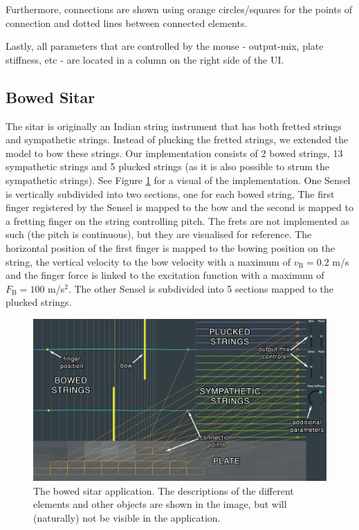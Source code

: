 \documentclass{article}
\begin{document}
Furthermore, connections are shown using orange circles/squares for the points of connection and dotted lines between connected elements.

Lastly, all parameters that are controlled by the mouse - output-mix, plate stiffness, etc - are located in a column on the right side of the UI.

\subsection{Bowed Sitar}
The sitar is originally an Indian string instrument that has both fretted strings and sympathetic strings. Instead of plucking the fretted strings, we extended the model to bow these strings. Our implementation consists of 2 bowed strings, 13 sympathetic strings and 5 plucked strings (as it is also possible to strum the sympathetic strings). See Figure \ref{fig:bowedSitar} for a visual of the implementation. One Sensel is vertically subdivided into two sections, one for each bowed string, The first finger registered by the Sensel is mapped to the bow and the second is mapped to a fretting finger on the string controlling pitch. The frets are not implemented as such (the pitch is continuous), but they are visualised for reference. The horizontal position of the first finger is mapped to the bowing position on the string, the vertical velocity  to the bow velocity with a maximum of $v_\text{B} = 0.2$ m/s and the finger force is linked to the excitation function with a maximum of $F_\text{B} = 100$ m/s$^2$. The other Sensel is subdivided into 5 sections mapped to the plucked strings. 

\begin{figure}[h]
\centering
\includegraphics[width=1.0\columnwidth]{LATEX/BowedSitar.png}
\caption{The bowed sitar application. The descriptions of the different elements and other objects are shown in the image, but will (naturally) not be visible in the application. \label{fig:bowedSitar}}
\end{figure}
\end{document}
